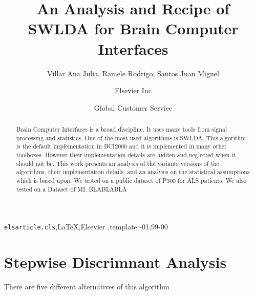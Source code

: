 \documentclass[review]{elsarticle}
\begin{document}
\begin{frontmatter}

\title{An Analysis and Recipe of SWLDA for Brain Computer Interfaces}

\author{Villar Ana Julia, Ramele Rodrigo, Santos Juan Miguel}
\address{C1437FBH Lavarden 315, Ciudad Autónoma de Buenos Aires, Argentina}

\author[mymainaddress,mysecondaryaddress]{Elsevier Inc}

\author[mysecondaryaddress]{Global Customer Service}

\address[mymainaddress]{1600 John F Kennedy Boulevard, Philadelphia}
\address[mysecondaryaddress]{360 Park Avenue South, New York}

\begin{abstract}
Brain Computer Interfaces is a broad discipline. It uses many tools from signal processing and statistics.
One of the most used algorithms is SWLDA.  This algorithm is the default implementation in BCI2000 and it is implemented in many other toolboxes.
However their implementation details are hidden and neglected when it should not be.  This work presents an analysis of the variants versions of the algorithms, their implementation details, and an analysis on the statistical assumptions which is based upon.
We tested on a public dataset of P300 for ALS patients.  We also tested on a Dataset of MI.
BLABLABLA
\end{abstract}

\begin{keyword}
\texttt{elsarticle.cls}\sep \LaTeX\sep Elsevier \sep template
-01\sep  99-00
\end{keyword}

\end{frontmatter}

\linenumbers

\section{Stepwise Discrimnant Analysis}

There are five different alternatives of this algorithm
\end{document}
